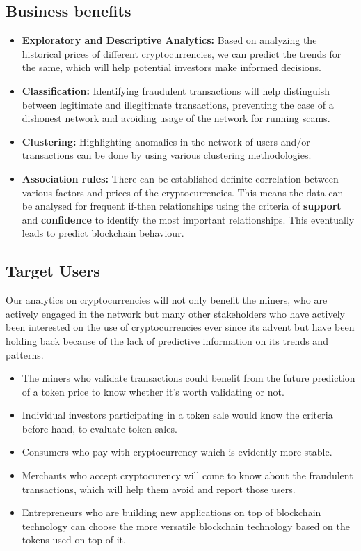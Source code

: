 \documentclass{article}
\begin{document}
\subsection{Business benefits}
\begin{itemize}
    \item \textbf{Exploratory and Descriptive Analytics:} Based on analyzing the historical prices of different cryptocurrencies, we can predict the trends for the same, which will help potential investors make informed decisions.
    \item \textbf{Classification:} Identifying fraudulent transactions will help distinguish between legitimate and illegitimate transactions, preventing the case of a dishonest network and avoiding usage of the network for running scams.
    \item \textbf{Clustering:} Highlighting anomalies in the network of users and/or transactions can be done by using various clustering methodologies.
    \item \textbf{Association rules:} There can be established definite correlation between various factors and prices of the cryptocurrencies. This means the data can be analysed for frequent if-then relationships using the criteria of \textbf{support} and \textbf{confidence} to identify the most important relationships. This eventually leads to predict blockchain behaviour.
\end{itemize}
\subsection{Target Users}
Our analytics on cryptocurrencies will not only benefit the miners, who are actively engaged in the network but many other stakeholders who have actively been interested on the use of cryptocurrencies ever since its advent but have been holding back because of the lack of predictive information on its trends and patterns.
\begin{itemize}
    \item The miners who validate transactions could benefit from the future prediction of a token price to know whether it's worth validating or not.
    \item Individual investors participating in a token sale would know the criteria before hand, to evaluate token sales.
    \item Consumers who pay with cryptocurrency which is evidently more stable.
    \item Merchants who accept cryptocurency will come to know about the fraudulent transactions, which will help them avoid and report those users.
    \item Entrepreneurs who are building new applications on top of blockchain technology can choose the more versatile blockchain technology based on the tokens used on top of it. 
\end{itemize}
\end{document}

